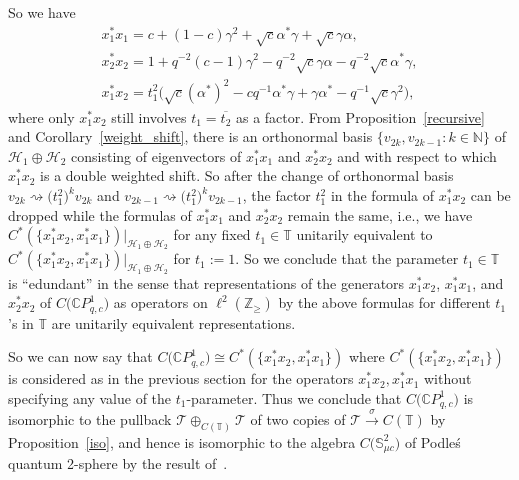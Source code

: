 \documentclass[11pt]{article}
\numberwithin{equation}{section}
\begin{document}
So we have
\begin{gather*}
x_{1}^{\ast}x_{1} =c+(1-c) \gamma^{2}+\sqrt{c}\alpha^{\ast
}\gamma+\sqrt{c}\gamma\alpha,\\
x_{2}^{\ast}x_{2} =1+q^{-2}(c-1) \gamma^{2}-q^{-2}\sqrt
{c}\gamma\alpha-q^{-2}\sqrt{c}\alpha^{\ast}\gamma,\\
x_{1}^{\ast}x_{2} =t_{1}^{2}\big( \sqrt{c} ( \alpha^{\ast} )
^{2}-cq^{-1}\alpha^{\ast}\gamma+\gamma\alpha^{\ast}-q^{-1}\sqrt{c}\gamma
^{2}\big) ,
\end{gather*}
where only $x_{1}^{\ast}x_{2}$ still involves $t_{1}=\overline{t_{2}}$ as a
factor. From Proposition~\ref{recursive} and Corollary~\ref{weight_shift}, there is an orthonormal
basis $ \{ v_{2k},v_{2k-1}\colon k\in\mathbb{N} \} $ of $\mathcal{H}%
_{1}\oplus\mathcal{H}_{2}$ consisting of eigenvectors of $x_{1}^{\ast}x_{1}$
and $x_{2}^{\ast}x_{2}$ and with respect to which $x_{1}^{\ast}x_{2}$ is a
double weighted shift. So after the change of orthonormal basis $v_{2k}%
\rightsquigarrow\big( t_{1}^{2}\big) ^{k}v_{2k}$ and $v_{2k-1}%
\rightsquigarrow\big( t_{1}^{2}\big) ^{k}v_{2k-1}$, the factor $t_{1}%
^{2}$ in the formula of $x_{1}^{\ast}x_{2}$ can be dropped while the formulas
of $x_{1}^{\ast}x_{1}$ and $x_{2}^{\ast}x_{2}$ remain the same, i.e., we have
$C^{\ast} ( \{ x_{1}^{\ast}x_{2},x_{1}^{\ast}x_{1} \}
 ) |_{\mathcal{H}_{1}\oplus\mathcal{H}_{2}}$ for any fixed $t_{1}%
\in\mathbb{T}$ unitarily equivalent to $C^{\ast} ( \{ x_{1}^{\ast
}x_{2},x_{1}^{\ast}x_{1} \} ) |_{\mathcal{H}_{1}\oplus
\mathcal{H}_{2}}$ for $t_{1}:=1$. So we conclude that the parameter $t_{1}%
\in\mathbb{T}$ is ``edundant'' in the sense
that representations of the generators $x_{1}^{\ast}x_{2}$, $x_{1}^{\ast}%
x_{1}$, and $x_{2}^{\ast}x_{2}$ of $C\big( \mathbb{C}P_{q,c}^{1}\big) $
as operators on $\ell^{2} ( \mathbb{Z}_{\geq} ) $ by the above
formulas for different $t_{1}$'s in $\mathbb{T}$ are unitarily equivalent representations.

So we can now say that $C\big( \mathbb{C}P_{q,c}^{1}\big) \cong C^{\ast
}( \{ x_{1}^{\ast}x_{2},x_{1}^{\ast}x_{1}\} ) $
where $C^{\ast}( \{ x_{1}^{\ast}x_{2},x_{1}^{\ast}x_{1}\}
) $ is considered as in the previous section for the operators
$x_{1}^{\ast}x_{2},x_{1}^{\ast}x_{1}$ without specifying any value of the
$t_{1}$-parameter. Thus we conclude that $C\big( \mathbb{C}P_{q,c}^{1}\big) $ is isomorphic to the pullback $\mathcal{T}\oplus_{C(\mathbb{T}) }\mathcal{T}$ of two copies of $\mathcal{T}\overset{\sigma
}{\rightarrow}C(\mathbb{T}) $ by Proposition~\ref{iso}, and hence is
isomorphic to the algebra $C\big( \mathbb{S}_{\mu c}^{2}\big) $ of
Podle\'{s} quantum 2-sphere by the result of~\cite{Sh:qp}.
\end{document}
